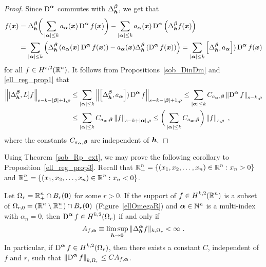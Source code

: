 \begin{proof}
Since $\displaystyle \operatorname{D}^{{\bm{\alpha}}}$ commutes with
$\displaystyle \Delta_{{\bm{h}}}^{{\bm{\beta}}}$, we get that
\begin{align*}
[\Delta^{\VEC{\beta}}_{\VEC{h}}, L] f(\VEC{x}) &=
\Delta^{\VEC{\beta}}_{\VEC{h}}\bigg(\sum_{|\VEC{\alpha}|\leq k}
a_{\VEC{\alpha}}(\VEC{x}) \diff^{\VEC{\alpha}} f(\VEC{x}) \bigg) -
\sum_{|\VEC{\alpha}|\leq k} a_{\VEC{\alpha}}(\VEC{x}) \diff^{\VEC{\alpha}}
\left(\Delta^{\VEC{\beta}}_{\VEC{h}} f(\VEC{x}) \right) \\
&= \sum_{|\VEC{\alpha}|\leq k} \left( \Delta^{\VEC{\beta}}_{\VEC{h}}
\left( a_{\VEC{\alpha}}(\VEC{x}) \diff^{\VEC{\alpha}} f(\VEC{x}) \right)
- a_{\VEC{\alpha}}(\VEC{x}) \Delta^{\VEC{\beta}}_{\VEC{h}}
\left( \diff^{\VEC{\alpha}} f(\VEC{x}) \right) \right)
= \sum_{|\VEC{\alpha}|\leq k} \left[ \Delta^{\VEC{\beta}}_{\VEC{h}},
a_{\VEC{\alpha}} \right]) \diff^{\VEC{\alpha}} f(\VEC{x})
\end{align*}
for all $\displaystyle f \in H^{s,2}(\mathbb{R}^n)$.  It follows from
Propositions~\ref{sob_DinDm} and \ref{ell_reg_prop1} that
\begin{align*}
\left\| [\Delta^{{\bm{\beta}}}_{{\bm{h}}}, L] f \right\|_{s-k-|{\bm{\beta}}|+1,\rho}
&\leq \sum_{|{\bm{\alpha}}|\leq k} \left\|\left[ \Delta^{{\bm{\beta}}}_{{\bm{h}}},
a_{{\bm{\alpha}}} \right])
\operatorname{D}^{{\bm{\alpha}}} f \right\|_{s-k-|{\bm{\beta}}|+1,\rho}
\leq \sum_{|{\bm{\alpha}}|\leq k} C_{a_{{\bm{\alpha}}},{\bm{\beta}}}
\left\| \operatorname{D}^{{\bm{\alpha}}} f \right\|_{s-k,\rho} \\
&\leq \sum_{|{\bm{\alpha}}|\leq k} C_{a_{{\bm{\alpha}}},{\bm{\beta}}}
\left\| f \right\|_{s-k+|{\bm{\alpha}}|,\rho}
\leq \bigg( \sum_{|{\bm{\alpha}}|\leq k} C_{a_{{\bm{\alpha}}},{\bm{\beta}}}\bigg)
\left\| f \right\|_{s,\rho} \ ,
\end{align*}
where the constants $C_{a_{\bm{\alpha}},{\bm{\beta}}}$ are independent
of ${\bm{h}}$.
\end{proof}

Using Theorem~\ref{sob_Rp_ext}, we may prove the following corollary
to Proposition~\ref{ell_reg_prop3}.  Recall that
$\displaystyle \mathbb{R}^n_+ = \{ (x_1,x_2,\ldots,x_n) \in \mathbb{R}^n : x_n>0 \}$
and $\displaystyle \mathbb{R}^n_- = \{ (x_1,x_2,\ldots,x_n) \in \mathbb{R}^n : x_n<0 \}$.

\begin{cor} \label{ell_reg_cor3}
Let $\displaystyle \Omega_r = \mathbb{R}^n_+ \cap B_r({\bm{0}})$ for some $r>0$.
If the support of $\displaystyle f\in H^{k,2}(\mathbb{R}^n)$ is a subset of
$\displaystyle \Omega_{r,0} = (\mathbb{R}^n \setminus \mathbb{R}^n_-) \cap
B_r({\bm{0}})$ (Figure~\ref{ellOmegaR}) and
${\bm{\alpha}} \in \mathbb{N}^n$ is a multi-index with $\alpha_n=0$, then
$\displaystyle \operatorname{D}^{{\bm{\alpha}}} f \in H^{k,2}(\Omega_r)$ if and only if
\[
A_{f,\VEC{\alpha}} \equiv \limsup_{\VEC{h}\rightarrow \VEC{0}}
\|\Delta^{\VEC{\alpha}}_{\VEC{h}} f\|_{k,\Omega_r} < \infty \ .
\]
In particular, if $\displaystyle \operatorname{D}^{{\bm{\alpha}}} f \in H^{k,2}(\Omega_r)$,
then there exists a constant $C$, independent of $f$ and $r$, such that 
$\displaystyle \left\| \operatorname{D}^{{\bm{\alpha}}} f \right\|_{k,\Omega_r} \leq
C A_{f,{\bm{\alpha}}}$.
\end{cor}

